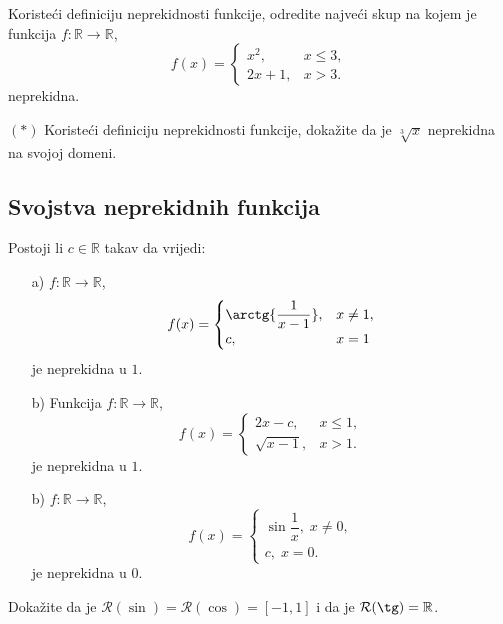 \begin{exercise}
Koristeći definiciju neprekidnosti funkcije, odredite najveći skup na kojem je funkcija $f : \mathbb{R}\to \mathbb{R}$,
$$f(x)=\begin{cases}
x^2,& x\leq 3,\\
2x+1,& x>3.
\end{cases}$$
neprekidna.
\end{exercise}
\begin{exercise} $(*)$
Koristeći definiciju neprekidnosti funkcije, dokažite da je $\sqrt[3]{x}$ neprekidna na svojoj domeni.
\end{exercise}
\subsection*{Svojstva neprekidnih funkcija}
\begin{exercise}
Postoji li $c\in \mathbb{R}$ takav da vrijedi:
\begin{itemize}
\item[a)] $f : \mathbb{R}\to \mathbb{R}$, $$f(x)=\begin{cases}
\arctg{\dfrac{1}{x-1}},& x\neq 1,\\
c, & x=1
\end{cases}$$ 
je neprekidna u $1$.
\item[b)] Funkcija $f : \mathbb{R}\to \mathbb{R}$, $$f(x)=\begin{cases}
2x-c,& x\leq 1,\\
\sqrt{x-1},& x>1.
\end{cases}$$
je neprekidna u $1$.
\item[b)] $f : \mathbb{R}\to \mathbb{R}$, $$f(x)=\begin{cases}
\sin{\dfrac{1}{x}},\; x\neq 0,\\
c,\; x=0.
\end{cases}$$
je neprekidna u $0$.
\end{itemize}
\end{exercise}
\begin{exercise}
Dokažite da je $\mathcal{R}(\sin)=\mathcal{R}(\cos)=[-1, 1]$ i da je $\mathcal{R}(\tg)=\mathbb{R}$.
\end{exercise}